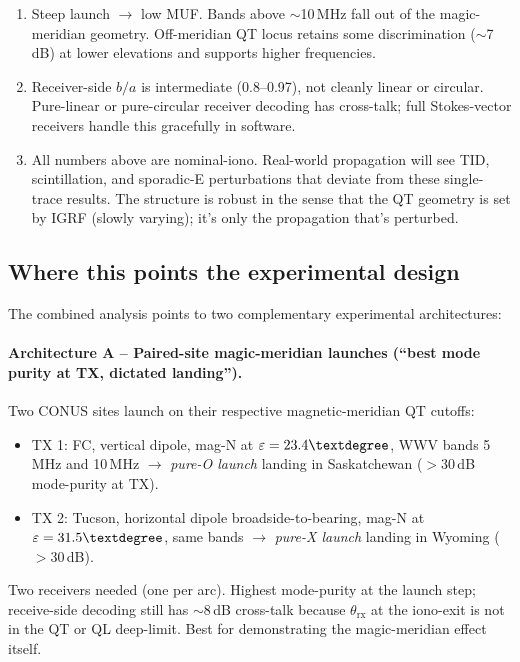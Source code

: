 \documentclass[11pt]{article}
\begin{document}
\begin{enumerate}
\item Steep launch $\to$ low MUF.  Bands above $\sim$10\,MHz fall
out of the magic-meridian geometry.  Off-meridian QT locus retains
some discrimination ($\sim$7\,dB) at lower elevations and supports
higher frequencies.
\item Receiver-side $b/a$ is intermediate (0.8--0.97), not cleanly
linear or circular.  Pure-linear or pure-circular receiver decoding
has cross-talk; full Stokes-vector receivers handle this gracefully
in software.
\item All numbers above are nominal-iono.  Real-world propagation
will see TID, scintillation, and sporadic-E perturbations that
deviate from these single-trace results.  The structure is robust
in the sense that the QT geometry is set by IGRF (slowly varying);
it's only the propagation that's perturbed.
\end{enumerate}

\subsection*{Where this points the experimental design}

The combined analysis points to two complementary experimental
architectures:

\paragraph{Architecture A -- Paired-site magic-meridian launches
(``best mode purity at TX, dictated landing'').}  Two CONUS sites
launch on their respective magnetic-meridian QT cutoffs:
\begin{itemize}
\item TX 1: FC, vertical dipole, mag-N at $\varepsilon = 23.4\textdegree$,
WWV bands 5\,MHz and 10\,MHz $\to$ \emph{pure-O launch} landing in
Saskatchewan ($>30$\,dB mode-purity at TX).
\item TX 2: Tucson, horizontal dipole broadside-to-bearing,
mag-N at $\varepsilon = 31.5\textdegree$, same bands $\to$
\emph{pure-X launch} landing in Wyoming ($>30$\,dB).
\end{itemize}
Two receivers needed (one per arc).  Highest mode-purity at the
launch step; receive-side decoding still has $\sim$8\,dB cross-talk
because $\theta_\text{rx}$ at the iono-exit is not in the QT or QL
deep-limit.  Best for demonstrating the magic-meridian effect
itself.
\end{document}

